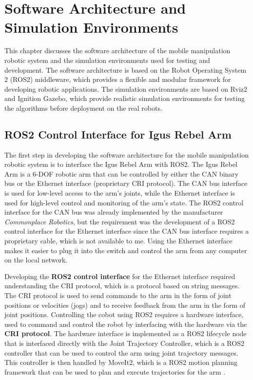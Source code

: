 
\chapter{Software Architecture and Simulation Environments}

This chapter discusses the software architecture of the mobile manipulation robotic system and the simulation 
environments used for testing and development. The software architecture is based on the Robot Operating System 2 (ROS2)
middleware, which provides a flexible and modular framework for developing robotic applications. 
The simulation environments are based on Rviz2 and Ignition Gazebo, which provide realistic simulation environments
for testing the algorithms before deployment on the real robots.

\section{ROS2 Control Interface for Igus Rebel Arm}

The first step in developing the software architecture for the mobile manipulation robotic system is to interface the
Igus Rebel Arm with ROS2. The Igus Rebel Arm is a 6-DOF robotic arm that can be controlled by either the CAN binary bus
or the Ethernet interface (proprietary CRI protocol). The CAN bus interface is used for low-level access to the arm's
joints, while the Ethernet interface is used for high-level control and monitoring of the arm's state. 
The ROS2 control interface for the CAN bus was already implemented by the manufacturer \textit{Commonplace Robotics},
but the requirement was the development of a ROS2 control interface for the Ethernet interface since the CAN bus interface
requires a proprietary cable, which is not available to me. Using the Ethernet interface makes it easier to 
plug it into the switch and control the arm from any computer on the local network.

Developing the \textbf{ROS2 control interface} for the Ethernet interface required understanding the CRI protocol, which
is a protocol based on string messages. The CRI protocol is used to send commands to the arm in the form of
joint positions or velocities (jogs) and to receive feedback from the arm in the form of joint positions.
Controlling the cobot using ROS2 requires a hardware interface, used to command and control the robot by interfacing
with the hardware via the \textbf{CRI protocol}. The hardware interface is implemented as a ROS2 lifecycle node that
is interfaced directly with the Joint Trajectory Controller, which is a ROS2 controller that can be used to
control the arm using joint trajectory messages. This controller is then handled by MoveIt2, which is a ROS2
motion planning framework that can be used to plan and execute trajectories for the arm \cite{moveit2}.

